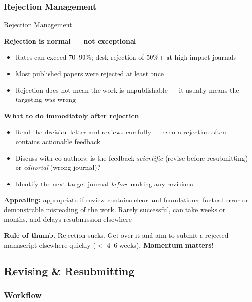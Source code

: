\documentclass{beamer}
\begin{document}
\subsubsection{Rejection Management}

\begin{frame}{Rejection Management}

  \footnotesize
  \textbf{Rejection is normal --- not exceptional}
  \begin{itemize}
    \item Rates can exceed 70--90\%; desk rejection of 50\%+ at high-impact journals
    \item Most published papers were rejected at least once
    \item Rejection does not mean the work is unpublishable ---
      it usually means the targeting was wrong
  \end{itemize}

  \medskip
  \textbf{What to do immediately after rejection}
  \begin{itemize}
    \item Read the decision letter and reviews carefully ---
      even a rejection often contains actionable feedback
    \item Discuss with co-authors: is the feedback
      \emph{scientific} (revise before resubmitting) or
      \emph{editorial} (wrong journal)?
    \item Identify the next target journal \emph{before}
      making any revisions
  \end{itemize}

  \medskip
  \textbf{Appealing:} 
      appropriate if review contains clear and foundational factual error
      or demonstrable misreading of the work.
      Rarely successful, can take weeks
      or months, and delays resubmission elsewhere

  \medskip
  \alert{\textbf{Rule of thumb:}} 
  Rejection sucks.  
  Get over it and aim to submit a rejected manuscript elsewhere quickly ($<$ 4--6 weeks). 
  \textbf{Momentum matters!}

\end{frame}



\subsection{Revising \& Resubmitting}

\subsubsection{Workflow}
\end{document}
